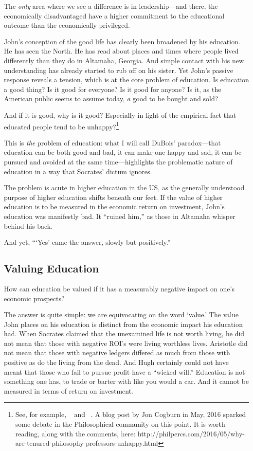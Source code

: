 The \emph{only} area where we see a difference is in leadership---and there, the economically disadvantaged have a higher commitment to the educational outcome than the economically privileged.

John's conception of the good life has clearly been broadened by his education. He has seen the North. He has read about places and times where people lived differently than they do in Altamaha, Georgia. And simple contact with his new understanding has already started to rub off on his sister. Yet John's passive response reveals a tension, which is at the core problem of education. Is education a good thing? Is it good for everyone? Is it good for anyone? Is it, as the American public seems to assume today, \emph{a} good to be bought and sold?

And if it is good, why is it good? Especially in light of the empirical fact that educated people tend to be unhappy?\footnote{See, for example, ~\citep{Pinsker:2016wu} and ~\citep{Raghunathan:2016vc}. A blog post by Jon Cogburn in May, 2016 sparked some debate in the Philosophical community on this point. It is worth reading, along with the comments, here: http:\slash \slash philpercs.com\slash 2016\slash 05\slash why-are-tenured-philosophy-professors-unhappy.html} 

This is \emph{the} problem of education: what I will call DuBois' paradox---that education can be both good and bad, it can make one happy and sad, it can be pursued and avoided at the same time---highlights the problematic nature of education in a way that Socrates' dictum ignores. 

The problem is acute in higher education in the US, as the generally understood purpose of higher education shifts beneath our feet. If the value of higher education is to be measured in the economic return on investment, John's education was manifestly bad. It ``ruined him,'' as those in Altamaha whisper behind his back. 

And yet, ```Yes' came the answer, slowly but positively.''

\subsection{Valuing Education}
\label{valuingeducation}

How can education be valued if it has a measurably negative impact on one's economic prospects?

The answer is quite simple: we are equivocating on the word `value.' The value John places on his education is distinct from the economic impact his education had. When Socrates claimed that the unexamined life is not worth living, he did not mean that those with negative ROI's were living worthless lives. Aristotle did not mean that those with negative ledgers differed as much from those with positive as do the living from the dead. And Hugh certainly could not have meant that those who fail to pursue profit have a ``wicked will.'' Education is not something one has, to trade or barter with like you would a car. And it cannot be measured in terms of return on investment.

